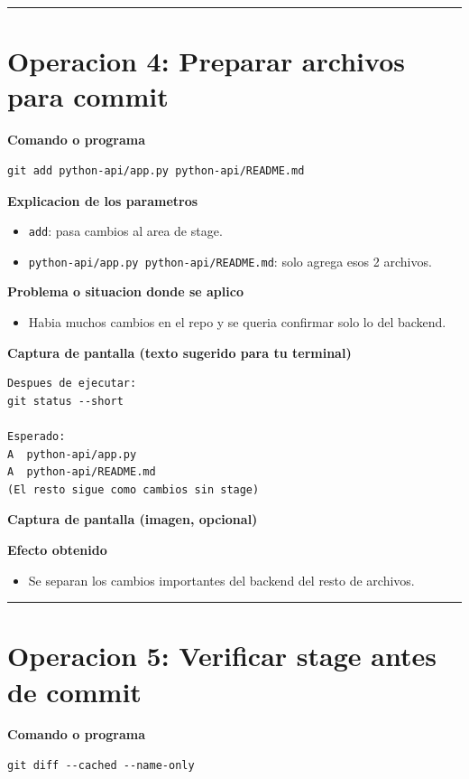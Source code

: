 \documentclass[12pt,a4paper]{article}
\begin{document}
\hrule
\vspace{0.4cm}

\section*{Operacion 4: Preparar archivos para commit}
\textbf{Comando o programa}
\begin{Verbatim}[fontsize=\small,frame=single]
git add python-api/app.py python-api/README.md
\end{Verbatim}

\textbf{Explicacion de los parametros}
\begin{itemize}[leftmargin=*]
\item \texttt{add}: pasa cambios al area de stage.
\item \texttt{python-api/app.py python-api/README.md}: solo agrega esos 2 archivos.
\end{itemize}

\textbf{Problema o situacion donde se aplico}
\begin{itemize}[leftmargin=*]
\item Habia muchos cambios en el repo y se queria confirmar solo lo del backend.
\end{itemize}

\textbf{Captura de pantalla (texto sugerido para tu terminal)}
\begin{Verbatim}[fontsize=\small,frame=single]
Despues de ejecutar:
git status --short

Esperado:
A  python-api/app.py
A  python-api/README.md
(El resto sigue como cambios sin stage)
\end{Verbatim}

\textbf{Captura de pantalla (imagen, opcional)}

\textbf{Efecto obtenido}
\begin{itemize}[leftmargin=*]
\item Se separan los cambios importantes del backend del resto de archivos.
\end{itemize}

\hrule
\vspace{0.4cm}

\section*{Operacion 5: Verificar stage antes de commit}
\textbf{Comando o programa}
\begin{Verbatim}[fontsize=\small,frame=single]
git diff --cached --name-only
\end{Verbatim}
\end{document}
